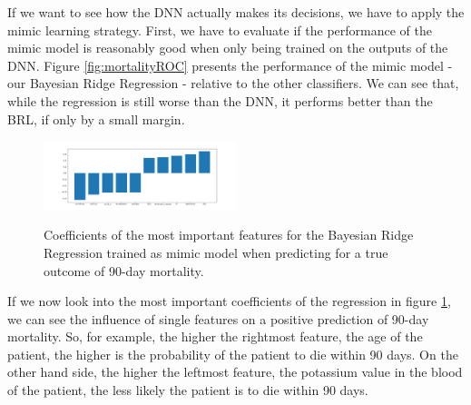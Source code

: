 \documentclass[conference,comsoc]{IEEEtran}
\begin{document}
If we want to see how the DNN actually makes its decisions, we have to apply the mimic learning strategy.
First, we have to evaluate if the performance of the mimic model is reasonably good when only being trained on the outputs of the DNN.
Figure \ref{fig:mortalityROC} presents the performance of the mimic model - our Bayesian Ridge Regression - relative to the other classifiers.
We can see that, while the regression is still worse than the DNN, it performs better than the BRL, if only by a small margin. \\

\begin{figure}[h]
	\includegraphics[width=0.5\textwidth]{coef_DIED_90DAYS.png}
	\label{fig:mortalityCOEF}
	\caption{Coefficients of the most important features for the Bayesian Ridge Regression trained as mimic model when predicting for a true outcome of 90-day mortality.}
\end{figure}

If we now look into the most important coefficients of the regression in figure \ref{fig:mortalityCOEF}, we can see the influence of single features on a positive prediction of 90-day mortality.
So, for example, the higher the rightmost feature, the age of the patient, the higher is the probability of the patient to die within 90 days.
On the other hand side, the higher the leftmost feature, the potassium value in the blood of the patient, the less likely the patient is to die within 90 days.
\end{document}
